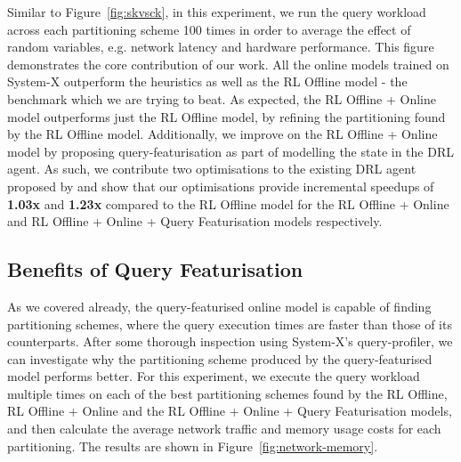 Similar to Figure~\ref{fig:skvsck}, in this experiment, we run the query workload across each partitioning scheme 100 times in order to average the effect of random variables, e.g. network latency and hardware performance. This figure demonstrates the core contribution of our work. All the online models trained on System-X outperform the heuristics as well as the RL Offline model - the benchmark which we are trying to beat. As expected, the RL Offline + Online model outperforms just the RL Offline model, by refining the partitioning found by the RL Offline model. Additionally, we improve on the RL Offline + Online model by proposing query-featurisation as part of modelling the state in the DRL agent. As such, we contribute two optimisations to the existing DRL agent proposed by \citeauthor{Hilprecht:2019:TLP:3329859.3329876} and show that our optimisations provide incremental speedups of \textbf{1.03x} and \textbf{1.23x} compared to the RL Offline model for the RL Offline + Online and RL Offline + Online + Query Featurisation models respectively.

\subsection{Benefits of Query Featurisation}
\label{sec:benefits-query-featurisation}
As we covered already, the query-featurised online model is capable of finding partitioning schemes, where the query execution times are faster than those of its counterparts. After some thorough inspection using System-X's query-profiler, we can investigate why the partitioning scheme produced by the query-featurised model performs better. For this experiment, we execute the query workload multiple times on each of the best partitioning schemes found by the RL Offline, RL Offline + Online and the RL Offline + Online + Query Featurisation models, and then calculate the average network traffic and memory usage costs for each partitioning. The results are shown in Figure~\ref{fig:network-memory}. 

